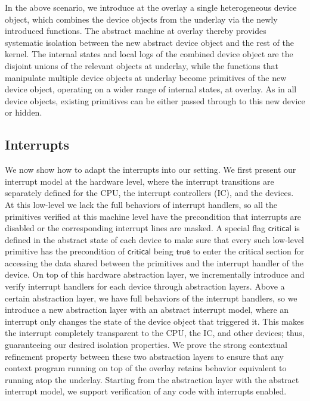 In the above scenario, we introduce at the overlay a single heterogeneous device
object, which combines the device objects from the underlay via the newly
introduced functions. The abstract machine at overlay thereby provides
systematic isolation between the new abstract device object and the rest of the
kernel. The internal states and local logs of the combined device object are the
disjoint unions of the relevant objects at underlay, while the functions that
manipulate multiple device objects at underlay become primitives of the new
device object, operating on a wider range of internal states, at overlay. As in
all device objects, existing primitives can be either passed through to this new
device or hidden.


\subsection{Interrupts}

We now show how to adapt the interrupts into our setting.  We first present our
interrupt model at the hardware level, where the interrupt transitions are
separately defined for the CPU, the interrupt controllers (IC), and the devices.
At this low-level we lack the full behaviors of interrupt handlers, so all the
primitives verified at this machine level have the precondition that interrupts
are disabled or the corresponding interrupt lines are masked. A special flag
$\mathsf{critical}$ is defined in the abstract state of each device to make sure
that every such low-level primitive has the precondition of $\mathsf{critical}$ 
being $\mathsf{true}$ to enter the critical section for accessing the data
shared between the primitives and the interrupt handler
of the device.  On top of this hardware abstraction layer, we
incrementally introduce and verify interrupt handlers for each device through
abstraction layers.  Above a certain abstraction layer, we have full behaviors
of the interrupt handlers, so we introduce a new abstraction layer with an
abstract interrupt model, where an interrupt only changes the state of the
device object that triggered it.  This makes the interrupt completely
transparent to the CPU, the IC, and other devices; thus, guaranteeing our
desired isolation properties.  We prove the strong contextual refinement
property between these two abstraction layers to ensure that any context program
running on top of the overlay retains behavior equivalent to running atop the
underlay. Starting from the abstraction layer with the abstract interrupt model,
we support verification of any code with interrupts enabled.

